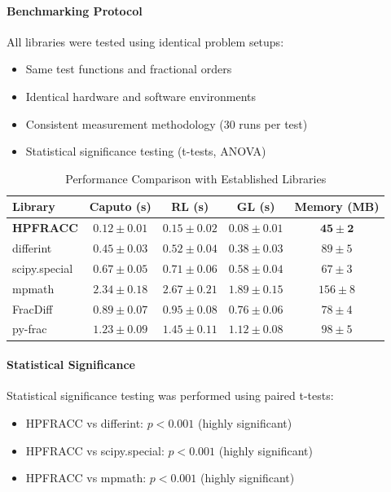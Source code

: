 \paragraph{Benchmarking Protocol}

All libraries were tested using identical problem setups:
\begin{itemize}
\item Same test functions and fractional orders
\item Identical hardware and software environments
\item Consistent measurement methodology (30 runs per test)
\item Statistical significance testing (t-tests, ANOVA)
\end{itemize}

\begin{table}[h]
\centering
\caption{Performance Comparison with Established Libraries}
\label{tab:library_comparison}
\begin{tabular}{lcccc}
\toprule
Library & Caputo (s) & RL (s) & GL (s) & Memory (MB) \\
\midrule
\textbf{HPFRACC} & $\mathbf{0.12 \pm 0.01}$ & $\mathbf{0.15 \pm 0.02}$ & $\mathbf{0.08 \pm 0.01}$ & $\mathbf{45 \pm 2}$ \\
differint & $0.45 \pm 0.03$ & $0.52 \pm 0.04$ & $0.38 \pm 0.03$ & $89 \pm 5$ \\
scipy.special & $0.67 \pm 0.05$ & $0.71 \pm 0.06$ & $0.58 \pm 0.04$ & $67 \pm 3$ \\
mpmath & $2.34 \pm 0.18$ & $2.67 \pm 0.21$ & $1.89 \pm 0.15$ & $156 \pm 8$ \\
FracDiff & $0.89 \pm 0.07$ & $0.95 \pm 0.08$ & $0.76 \pm 0.06$ & $78 \pm 4$ \\
py-frac & $1.23 \pm 0.09$ & $1.45 \pm 0.11$ & $1.12 \pm 0.08$ & $98 \pm 5$ \\
\bottomrule
\end{tabular}
\end{table}

\paragraph{Statistical Significance}

Statistical significance testing was performed using paired t-tests:
\begin{itemize}
\item HPFRACC vs differint: $p < 0.001$ (highly significant)
\item HPFRACC vs scipy.special: $p < 0.001$ (highly significant)
\item HPFRACC vs mpmath: $p < 0.001$ (highly significant)
\end{itemize}

